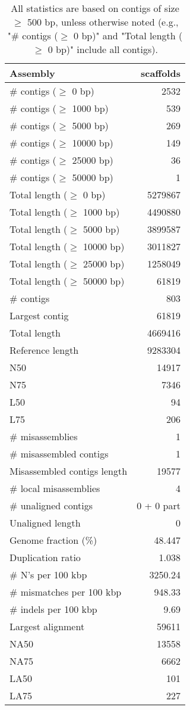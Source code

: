 \documentclass[12pt,a4paper]{article}
\begin{document}
\begin{table}[ht]
\begin{center}
\caption{All statistics are based on contigs of size $\geq$ 500 bp, unless otherwise noted (e.g., "\# contigs ($\geq$ 0 bp)" and "Total length ($\geq$ 0 bp)" include all contigs).}
\begin{tabular}{|l*{1}{|r}|}
\hline
Assembly & scaffolds \\ \hline
\# contigs ($\geq$ 0 bp) & 2532 \\ \hline
\# contigs ($\geq$ 1000 bp) & 539 \\ \hline
\# contigs ($\geq$ 5000 bp) & 269 \\ \hline
\# contigs ($\geq$ 10000 bp) & 149 \\ \hline
\# contigs ($\geq$ 25000 bp) & 36 \\ \hline
\# contigs ($\geq$ 50000 bp) & 1 \\ \hline
Total length ($\geq$ 0 bp) & 5279867 \\ \hline
Total length ($\geq$ 1000 bp) & 4490880 \\ \hline
Total length ($\geq$ 5000 bp) & 3899587 \\ \hline
Total length ($\geq$ 10000 bp) & 3011827 \\ \hline
Total length ($\geq$ 25000 bp) & 1258049 \\ \hline
Total length ($\geq$ 50000 bp) & 61819 \\ \hline
\# contigs & 803 \\ \hline
Largest contig & 61819 \\ \hline
Total length & 4669416 \\ \hline
Reference length & 9283304 \\ \hline
N50 & 14917 \\ \hline
N75 & 7346 \\ \hline
L50 & 94 \\ \hline
L75 & 206 \\ \hline
\# misassemblies & 1 \\ \hline
\# misassembled contigs & 1 \\ \hline
Misassembled contigs length & 19577 \\ \hline
\# local misassemblies & 4 \\ \hline
\# unaligned contigs & 0 + 0 part \\ \hline
Unaligned length & 0 \\ \hline
Genome fraction (\%) & 48.447 \\ \hline
Duplication ratio & 1.038 \\ \hline
\# N's per 100 kbp & 3250.24 \\ \hline
\# mismatches per 100 kbp & 948.33 \\ \hline
\# indels per 100 kbp & 9.69 \\ \hline
Largest alignment & 59611 \\ \hline
NA50 & 13558 \\ \hline
NA75 & 6662 \\ \hline
LA50 & 101 \\ \hline
LA75 & 227 \\ \hline
\end{tabular}
\end{center}
\end{table}
\end{document}
